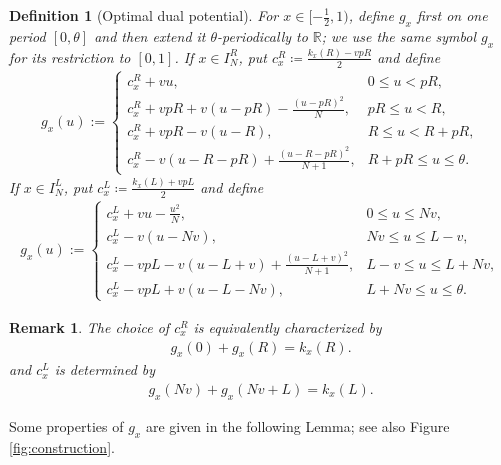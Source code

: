 \documentclass{article}
\newtheorem{definition}[theorem]{Definition}
\newtheorem{remark}[theorem]{Remark}
\begin{document}
\begin{definition}[Optimal dual potential]
\label{def:dual-potential}
For \(x\in[-\frac12,1)\), define \(g_x\) first on one period \([0,\theta]\) and then extend it \(\theta\)-periodically to \(\mathbb R\); we use the same symbol \(g_x\) for its restriction to \([0,1]\).
If \(x\in I_N^R\), put
\(
    c_x^R\coloneqq\frac{k_x(R)-vpR}{2}
\)
and define
\begin{align}\label{def:dual-potential-value-right}
    g_x(u)
    :=
    \begin{cases}
        c_x^R+vu,
        &0\leq u<pR,\\[1mm]
        \displaystyle
        c_x^R+vpR+v(u-pR)-\frac{(u-pR)^2}{N},
        &pR\leq u<R,\\[3mm]
        c_x^R+vpR-v(u-R),
        &R\leq u<R+pR,\\[1mm]
        \displaystyle
        c_x^R-v(u-R-pR)+\frac{(u-R-pR)^2}{N+1},
        &R+pR\leq u\leq\theta.
    \end{cases}
\end{align}
If \(x\in I_N^L\), put
\(
    c_x^L\coloneqq\frac{k_x(L)+vpL}{2}
\)
and define
\begin{align}\label{def:dual-potential-value-left}
    g_x(u)
    :=
    \begin{cases}
        \displaystyle
        c_x^L+vu-\frac{u^2}{N},
        &0\leq u\leq Nv,\\[3mm]
        c_x^L-v(u-Nv),
        &Nv\leq u\leq L-v,\\[1mm]
        \displaystyle
        c_x^L-vpL-v(u-L+v)+\frac{(u-L+v)^2}{N+1},
        &L-v\leq u\leq L+Nv,\\[3mm]
        c_x^L-vpL+v(u-L-Nv),
        &L+Nv\leq u\leq\theta.
    \end{cases}
\end{align}
\end{definition}

\begin{remark}
    The choice of \(c_x^R\) is equivalently characterized by
\begin{align}\label{eq:normalization-potential-right}
    g_x(0)+g_x(R)=k_x(R).
\end{align}
and \(c_x^L\) is determined by
\begin{align}\label{eq:normalization-potential-left}
    g_x(Nv)+g_x(Nv+L)=k_x(L).
\end{align}
\end{remark}



Some properties of \(g_x\) are given in the following Lemma; see also Figure \ref{fig:construction}.
\end{document}
